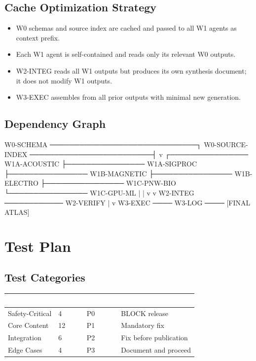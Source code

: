 \documentclass[11pt,letterpaper]{article}
\newcommand{\tableheader}[1]{\textbf{\sffamily\textcolor{white}{#1}}}
\begin{document}
\subsection{Cache Optimization Strategy}

\begin{itemize}[noitemsep]
  \item W0 schemas and source index are cached and passed to all W1 agents as context prefix.
  \item Each W1 agent is self-contained and reads only its relevant W0 outputs.
  \item W2-INTEG reads all W1 outputs but produces its own synthesis document; it does not modify W1 outputs.
  \item W3-EXEC assembles from all prior outputs with minimal new generation.
\end{itemize}

\subsection{Dependency Graph}

\begin{asciibox}
W0-SCHEMA ──────────────────────────────┐
W0-SOURCE-INDEX ─────────────────────────┤
                                         v
              ┌──────────────── W1A-ACOUSTIC
              ├──────────────── W1A-SIGPROC
              ├──────────────── W1B-MAGNETIC
              ├──────────────── W1B-ELECTRO
              ├──────────────── W1C-PNW-BIO
              └──────────────── W1C-GPU-ML
                    |                    |
                    v                    v
              W2-INTEG ──────────── W2-VERIFY
                    |
                    v
              W3-EXEC ──── W3-LOG ──── [FINAL ATLAS]
\end{asciibox}

\section{Test Plan}

\subsection{Test Categories}

\begin{center}
\begin{tabularx}{\textwidth}{L{3cm}C{1.5cm}L{2cm}X}
\toprule
{}
\tableheader{Category} & \tableheader{Count} & \tableheader{Priority} & \tableheader{Action on Failure} \\
\midrule
Safety-Critical & 4 & P0 & BLOCK release \\
Core Content & 12 & P1 & Mandatory fix \\
Integration & 6 & P2 & Fix before publication \\
Edge Cases & 4 & P3 & Document and proceed \\
\bottomrule
\end{tabularx}
\end{center}
\end{document}
